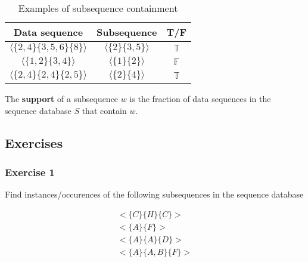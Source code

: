 \begin{table}[h]
\centering
\begin{tabular}{|c|c|c|}
\hline
\textbf{Data sequence} & \textbf{Subsequence} & \textbf{T/F} \\ \hline
$\langle \{2,4\} \{3,5,6\} \{8\} \rangle$ & $\langle \{2\} \{3,5\} \rangle$ & $\mathbb{T}$ \\ \hline
$\langle \{1,2\} \{3,4\} \rangle$ & $\langle \{1\} \{2\} \rangle$ & $\mathbb{F}$ \\ \hline
$\langle \{2,4\} \{2,4\} \{2,5\} \rangle$ & $\langle \{2\} \{4\} \rangle$ & $\mathbb{T}$ \\ \hline
\end{tabular}
\caption{Examples of subsequence containment}
\label{tab:subsequence-examples}
\end{table}

\begin{definition}
   The \textbf{support} of a subsequence $w$ is the fraction of data sequences in the sequence database $S$ that contain $w$.
\end{definition}

\subsection{Exercises}
\subsubsection{Exercise 1}
Find instances/occurences of the following subsequences in the sequence database 

\begin{align*}
   <\{C\}\{H\}\{C\}> \\
   <\{A\} \{F\} > \\
   <\{A\}\{A\}\{D\}> \\
   <\{A\}\{A,B\}\{F\}> 
\end{align*}
